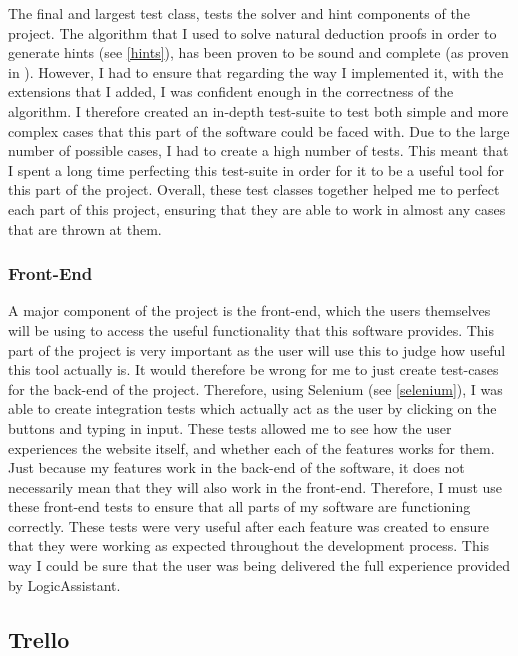 The final and largest test class, tests the solver and hint components of the project. The algorithm that I used to solve natural deduction proofs in order to generate hints (see \ref{hints}), has been proven to be sound and complete (as proven in \cite{ndAlgo}). However, I had to ensure that regarding the way I implemented it, with the extensions that I added, I was confident enough in the correctness of the algorithm. I therefore created an in-depth test-suite to test both simple and more complex cases that this part of the software could be faced with. Due to the large number of possible cases, I had to create a high number of tests. This meant that I spent a long time perfecting this test-suite in order for it to be a useful tool for this part of the project. Overall, these test classes together helped me to perfect each part of this project, ensuring that they are able to work in almost any cases that are thrown at them.

\subsubsection{Front-End}

A major component of the project is the front-end, which the users themselves will be using to access the useful functionality that this software provides. This part of the project is very important as the user will use this to judge how useful this tool actually is. It would therefore be wrong for me to just create test-cases for the back-end of the project. Therefore, using Selenium (see \ref{selenium}), I was able to create integration tests which actually act as the user by clicking on the buttons and typing in input. These tests allowed me to see how the user experiences the website itself, and whether each of the features works for them. Just because my features work in the back-end of the software, it does not necessarily mean that they will also work in the front-end. Therefore, I must use these front-end tests to ensure that all parts of my software are functioning correctly. These tests were very useful after each feature was created to ensure that they were working as expected throughout the development process. This way I could be sure that the user was being delivered the full experience provided by LogicAssistant.

\subsection{Trello \label{trello}}

